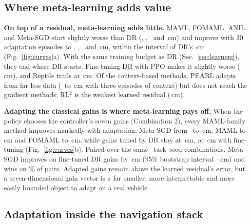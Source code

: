 \subsection{Where meta-learning adds value}\label{sec:rq2}

\textbf{On top of a residual, meta-learning adds little.} MAML, FOMAML, ANIL and Meta-SGD start slightly worse than DR (\valResMamlPre, \valResFomamlPre, \valResAnilPre\ and \valResMetasgdPre\,cm) and improve with 30 adaptation episodes to \valResMamlPost, \valResFomamlPost, \valResAnilPost\ and \valResMetasgdPost\,cm, within the interval of DR's \valResDrPost\,cm (Fig.~\ref{fig:curves}a). With the same training budget as DR (Sec.~\ref{sec:learners}), they end where DR starts. Fine-tuning DR with PPO makes it slightly worse (\valResDrftPost\,cm), and Reptile trails at \valResReptilePost\,cm. Of the context-based methods, PEARL adapts from far less data (\valResPearlPre\ to \valResPearlPost\,cm with three episodes of context) but does not reach the gradient methods; RL$^2$ is the weakest learned residual (\valResRltwoPost\,cm).

\textbf{Adapting the classical gains is where meta-learning pays off.} When the policy chooses the controller's seven gains (Combination 2), every MAML-family method improves markedly with adaptation: Meta-SGD from \valGainMetasgdPre\ to \valGainMetasgdPost\,cm, MAML to \valGainMamlPost\,cm and FOMAML to \valGainFomamlPost\,cm, while gains tuned by DR stay at \valGainDrPost\,cm, or \valGainDrftPost\,cm with fine-tuning (Fig.~\ref{fig:curves}b). Paired over the same \valGainPairedN\ task--seed combinations, Meta-SGD improves on fine-tuned DR gains by \valGainPairedDiff\,cm (95\% bootstrap interval \valGainPairedLo--\valGainPairedHi\,cm) and wins on \valGainPairedWin\% of pairs. Adapted gains remain above the learned residual's error, but a seven-dimensional gain vector is a far smaller, more interpretable and more easily bounded object to adapt on a real vehicle.

\subsection{Adaptation inside the navigation stack}\label{sec:rq3}

\begin{table}[t]
\centering
\caption{Navigation in unseen rooms. The classical local planner is the most reliable on the full stack, and gradient-based adaptation at the meta-trained step size lowers learned planners' success. Success and collision rates before and after adapting, with the privileged planner (3 stages) and on the full online-mapping stack (1 stage), and OOD success. \valSeedsNav\ training seeds; each episode in its own unseen room. Bold: best in column.}
\label{tab:nav}
\footnotesize

\end{table}


